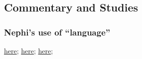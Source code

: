 
	
	
	
	
\subsection{Commentary and Studies} %
	\label{LANGUAGE-COMMENTARY}

	
		
	\subsubsection{Nephi's use of ``language''}
		\label{LANGUAGE-nephi}
		
		\hyperref[1NEPHI-1-2]{here}; \hyperref[1NEPHI-3-19]{here}; \hyperref[2NEPHI-31-3]{here};
